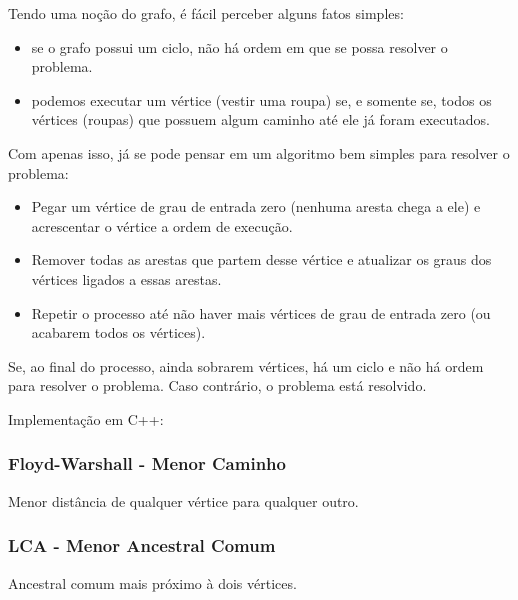 \documentclass[a4paper,12pt]{article}
\begin{document}
\noindent Tendo uma noção do grafo, é fácil perceber alguns fatos simples:

\begin{itemize}
    \item se o grafo possui um ciclo, não há ordem em que se possa resolver o problema.
    \item podemos executar um vértice (vestir uma roupa) se, e somente se, todos os vértices (roupas) que possuem algum caminho até ele já foram executados.
\end{itemize}

\noindent Com apenas isso, já se pode pensar em um algoritmo bem simples para resolver o problema:

\begin{itemize}
    \item Pegar um vértice de grau de entrada zero (nenhuma aresta chega a ele) e acrescentar o vértice a ordem de execução.
    \item Remover todas as arestas que partem desse vértice e atualizar os graus dos vértices ligados a essas arestas.
    \item Repetir o processo até não haver mais vértices de grau de entrada zero (ou acabarem todos os vértices).
\end{itemize}

\noindent Se, ao final do processo, ainda sobrarem vértices, há um ciclo e não há ordem para resolver o problema. Caso contrário, o problema está resolvido.

\noindent Implementação em C++:

\subsubsection{Floyd-Warshall - Menor Caminho}

Menor distância de qualquer vértice para qualquer outro.

\subsubsection{LCA - Menor Ancestral Comum}

Ancestral comum mais próximo à dois vértices.
\end{document}
